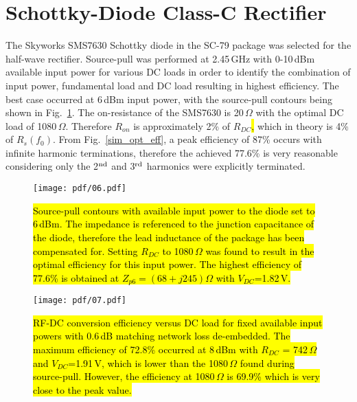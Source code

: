 \section{Schottky-Diode Class-C Rectifier}

The Skyworks SMS7630 Schottky diode in the SC-79 package was selected for the half-wave rectifier. Source-pull was performed at 2.45\,GHz with 0-10\,dBm available input power for various DC loads in order to identify the combination of input power, fundamental load and DC load resulting in highest efficiency.  The best case occurred at 6\,dBm input power, with the source-pull contours being shown in Fig.~\ref{lpcontours}.  The on-resistance of the SMS7630 is 20\,$\Omega$ with the optimal DC load of 1080\,$\Omega$. Therefore $R_{on}$ is approximately 2\% of $R_{DC}$\hl{,} which in theory is 4\% of $R_s(f_0)$.  From Fig.~\ref{sim_opt_eff}, a peak efficiency of 87\% occurs with infinite harmonic terminations, therefore the achieved 77.6\% is very reasonable considering only the 2$^{\rm nd}$ and 3$^{\rm rd}$ harmonics were explicitly terminated.



\begin{figure}
  \begin{center}
  \texttt{[image: pdf/06.pdf]}\\
 \caption{\hl{Source-pull contours with available input power to the diode set to 6\,dBm.  The impedance is referenced to the junction capacitance of the diode, therefore the lead inductance of the package has been compensated for. Setting $R_{DC}$ to 1080\,$\Omega$ was found to result in the optimal efficiency for this input power. The highest efficiency of 77.6\% is obtained at $Z_{p6}=(68+j245)\Omega$ with $V_{DC}$=1.82\,V.}}\label{lpcontours}
  \end{center}
\end{figure}
 


\begin{figure}
  \begin{center}
  \texttt{[image: pdf/07.pdf]}\\
 \caption{\hl{RF-DC conversion efficiency versus DC load for fixed available input powers with 0.6\,dB matching network loss de-embedded.  The maximum efficiency of 72.8\% occurred at 8\,dBm with $R_{DC}$ = 742\,$\Omega$ and $V_{DC}$=1.91\,V, which is lower than the 1080\,$\Omega$ found during source-pull.  However, the efficiency at 1080\,$\Omega$ is 69.9\% which is very close to the peak value.}}\label{final_dc_sweep}
  \end{center}
\end{figure}
 
